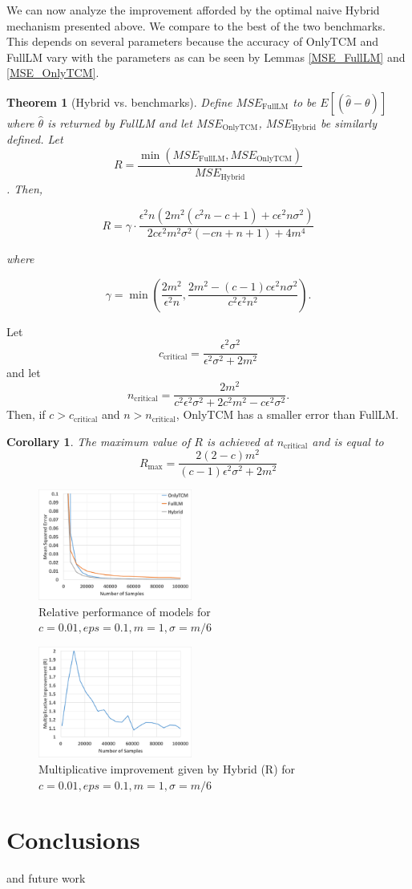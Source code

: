 \documentclass[sigconf]{acmart}
\theoremstyle{plain}
\newtheorem{thm}{Theorem}[section]
\newtheorem*{cor}{Corollary}
\begin{document}
We can now analyze the improvement afforded by the optimal naive Hybrid mechanism presented above. We compare to the best of the two benchmarks. This depends on several parameters because the accuracy of OnlyTCM and FullLM vary with the parameters as can be seen by Lemmas \ref{MSE_FullLM} and \ref{MSE_OnlyTCM}. 

\begin{thm}[Hybrid vs. benchmarks]
Define $MSE_{\text{FullLM}}$ to be $E[(\hat{\theta} - \theta)]$ where $\hat{\theta}$ is returned by FullLM and let $MSE_{\text{OnlyTCM}}$, $MSE_{\text{Hybrid}}$ be similarly defined.
Let 
$$R = \frac{\min(MSE_{\text{FullLM}}, MSE_{\text{OnlyTCM}})}{MSE_{\text{Hybrid}}}$$.
Then, 

$$R = \gamma \cdot \frac{\epsilon^2 n \left(2 m^2 \left(c^2 n-c+1\right)+c \epsilon^2 n \sigma^2\right)}{2 c \epsilon^2 m^2 \sigma^2 (-c n+n+1)+4 m^4}$$

where 

$$\gamma = \min \left(\frac{2 m^2}{\epsilon^2 n},\frac{2 m^2-(c-1) c \epsilon^2 n \sigma^2}{c^2 \epsilon^2 n^2}\right).$$
\end{thm}

Let $$c_{\text{critical}} = \frac{\epsilon^2 \sigma^2}{\epsilon^2 \sigma^2+2 m^2}$$ and let $$n_{\text{critical}} = \frac{2 m^2}{c^2 \epsilon^2 \sigma^2+2 c^2 m^2-c \epsilon^2 \sigma^2}.$$ Then, if $c>c_{\text{critical}}$ and $n > n_{\text{critical}}$, OnlyTCM has a smaller error than FullLM.

\begin{cor}
The maximum value of $R$ is achieved at $n_{\text{critical}}$ and is equal to $$R_{\text{max}} = \frac{2 (2-c) m^2}{(c-1) \epsilon^2 \sigma^2+2 m^2}$$
\end{cor}

\begin{figure}[h]
\includegraphics[width=0.45\textwidth]{eps01c01.pdf}
\caption{Relative performance of models for $c=0.01, eps=0.1, m=1, \sigma = m/6$}
\end{figure}

\begin{figure}[h]
\includegraphics[width=0.45\textwidth]{imp_eps01c01.pdf}
\caption{Multiplicative improvement given by Hybrid (R) for $c=0.01, eps=0.1, m=1, \sigma = m/6$}
\end{figure}


\section{Conclusions}
and future work



\end{document}

